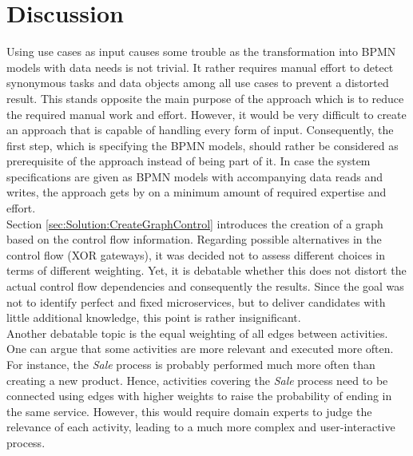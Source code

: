 \section{Discussion}
Using use cases as input causes some trouble as the transformation into BPMN models with data needs is not trivial. It rather requires manual effort to detect synonymous tasks and data objects among all use cases to prevent a distorted result. This stands opposite the main purpose of the approach which is to reduce the required manual work and effort. However, it would be very difficult to create an approach that is capable of handling every form of input. Consequently, the first step, which is specifying the BPMN models, should rather be considered as prerequisite of the approach instead of being part of it. In case the system specifications are given as BPMN models with accompanying data reads and writes, the approach gets by on a minimum amount of required expertise and effort. \\
Section \ref{sec:Solution:CreateGraphControl} introduces the creation of a graph based on the control flow information. Regarding possible alternatives in the control flow (XOR gateways), it was decided not to assess different choices in terms of different weighting. Yet, it is debatable whether this does not distort the actual control flow dependencies and consequently the results. Since the goal was not to identify perfect and fixed microservices, but to deliver candidates with little additional knowledge, this point is rather insignificant. \\
Another debatable topic is the equal weighting of all edges between activities. One can argue that some activities are more relevant and executed more often. For instance, the \textit{Sale} process is probably performed much more often than creating a new product. Hence, activities covering the \textit{Sale} process need to be connected using edges with higher weights to raise the probability of ending in the same service. However, this would require domain experts to judge the relevance of each activity, leading to a much more complex and user-interactive process. \\ 
